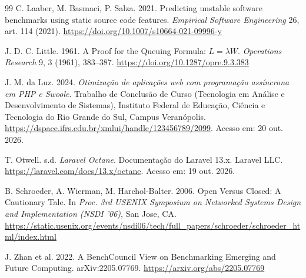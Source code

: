 \documentclass[sigconf, nonacm, screen, anonymous, language=portuguese, language=spanish, language={main=english}]{acmart}
\begin{document}
\begin{thebibliography}{99}
C. Laaber, M. Basmaci, P. Salza. 2021. Predicting unstable software benchmarks using static source code features. \textit{Empirical Software Engineering} 26, art. 114 (2021). \url{https://doi.org/10.1007/s10664-021-09996-y}

J. D. C. Little. 1961. A Proof for the Queuing Formula: $L=\lambda W$. \textit{Operations Research} 9, 3 (1961), 383--387. \url{https://doi.org/10.1287/opre.9.3.383}

J. M. da Luz. 2024. \textit{Otimização de aplicações web com programação assíncrona em PHP e Swoole}. Trabalho de Conclusão de Curso (Tecnologia em Análise e Desenvolvimento de Sistemas), Instituto Federal de Educação, Ciência e Tecnologia do Rio Grande do Sul, Campus Veranópolis. \url{https://dspace.ifrs.edu.br/xmlui/handle/123456789/2099}. Acesso em: 20 out. 2026.

T. Otwell. s.d. \textit{Laravel Octane}. Documentação do Laravel 13.x. Laravel LLC. \url{https://laravel.com/docs/13.x/octane}. Acesso em: 19 out. 2026.

B. Schroeder, A. Wierman, M. Harchol-Balter. 2006. Open Versus Closed: A Cautionary Tale. In \textit{Proc. 3rd USENIX Symposium on Networked Systems Design and Implementation (NSDI '06)}, San Jose, CA. \url{https://static.usenix.org/events/nsdi06/tech/full_papers/schroeder/schroeder_html/index.html}

J. Zhan et al. 2022. A BenchCouncil View on Benchmarking Emerging and Future Computing. arXiv:2205.07769. \url{https://arxiv.org/abs/2205.07769}

\end{thebibliography}
\end{document}
